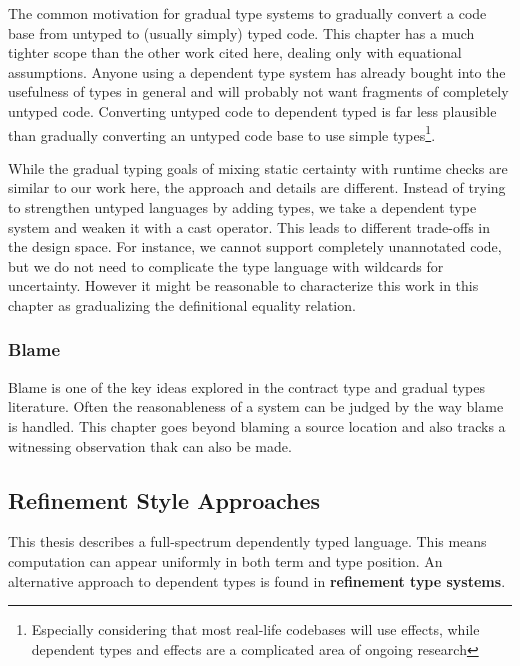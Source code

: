 The common motivation for gradual type systems to gradually convert a code base from untyped to (usually simply) typed code.
This chapter has a much tighter scope than the other work cited here, dealing only with equational assumptions.
Anyone using a dependent type system has already bought into the usefulness of types in general and will probably not want fragments of completely untyped code.
Converting untyped code to dependent typed is far less plausible than gradually converting an untyped code base to use simple types\footnote{
 Especially considering that most real-life codebases will use effects, while dependent types and effects are a complicated area of ongoing research
 }.
 
While the gradual typing goals of mixing static certainty with runtime checks are similar to our work here, the approach and details are different.
Instead of trying to strengthen untyped languages by adding types, we take a dependent type system and weaken it with a cast operator.
This leads to different trade-offs in the design space.
For instance, we cannot support completely unannotated code, but we do not need to complicate the type language with wildcards for uncertainty.
However it might be reasonable to characterize this work in this chapter as gradualizing the definitional equality relation.
 
\subsubsection{Blame}
 
Blame is one of the key ideas explored in the contract type and gradual types literature\cite{10.1007/978-3-642-00590-9_1,wadler:LIPIcs:2015:5033,10.1145/3110283}.
Often the reasonableness of a system can be judged by the way blame is handled\cite{wadler:LIPIcs:2015:5033}.
This chapter goes beyond blaming a source location and also tracks a witnessing observation thak can also be made.
 
\subsection{Refinement Style Approaches}
 
This thesis describes a full-spectrum dependently typed language.
This means computation can appear uniformly in both term and type position.
An alternative approach to dependent types is found in \textbf{refinement type systems}.
 
